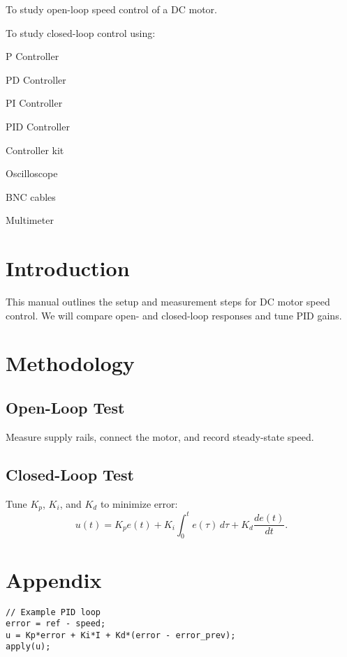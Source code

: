 \documentclass[11pt]{SEEELab} %
\begin{document}
\makelabtitle
\makemargintoc

\begin{ObjectivesList}
  \item To study open-loop speed control of a DC motor.
  \item To study closed-loop control using:
    \begin{AlphaList}
      \item P Controller
      \item PD Controller
      \item PI Controller
      \item PID Controller
    \end{AlphaList}
\end{ObjectivesList}

\begin{ApparatusList}
  \item Controller kit
  \item Oscilloscope
  \item BNC cables
  \item Multimeter
\end{ApparatusList}


\section{Introduction}
This manual outlines the setup and measurement steps for DC motor speed control.
We will compare open- and closed-loop responses and tune PID gains.

\section{Methodology}
\subsection{Open-Loop Test}
Measure supply rails, connect the motor, and record steady-state speed.

\subsection{Closed-Loop Test}
Tune $K_p$, $K_i$, and $K_d$ to minimize error:
\[
u(t) = K_p e(t) + K_i \int_0^t e(\tau)\,d\tau + K_d \frac{de(t)}{dt}.
\]

\appendix
\section*{Appendix}
\begin{lstlisting}
// Example PID loop
error = ref - speed;
u = Kp*error + Ki*I + Kd*(error - error_prev);
apply(u);
\end{lstlisting}
\end{document}
